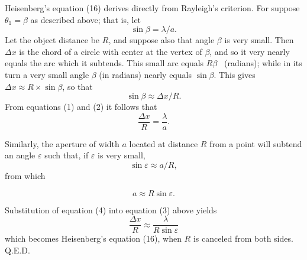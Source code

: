 \documentclass{article}
\begin{document}
Heisenberg's equation (16) derives directly from
Rayleigh's criterion. For suppose $\theta_1 = \beta$ as described
above; that is, let
%
\begin{equation}
\sin \beta = \lambda/a. %
\end{equation}
%
Let the object distance be $R$, and suppose also that angle
$\beta$ is very small. Then $\Delta x$ is the chord of a circle with
center at the vertex of $\beta$, and so it very nearly equals the arc
which it subtends. This small arc equals $R\beta$ \ (radians);
while in its turn a very small angle $\beta$ (in radians) nearly equals
$\sin \beta$. This gives $\Delta x \approx R \times \sin\beta$, so that
%
\begin{equation}
\sin \beta \approx \Delta x/R . %
\end{equation}
%
From equations (1) and (2) it follows that
%
\begin{equation}
\frac{\Delta x}{R} = \frac{\lambda}{a}. %
\end{equation}
%


Similarly, the aperture of width $a$ located at distance $R$
from a point will subtend an angle $\varepsilon$ such that, if $\varepsilon$ is
very small,
%
\begin{equation*}
\sin \varepsilon \approx a/R,
\end{equation*}
%
from which

\begin{equation}
a \approx R \sin \varepsilon. %
\end{equation}

Substitution of equation (4) into equation (3) above yields
%
\begin{equation*}
\frac{\Delta x}{R} \approx \frac{\lambda}{R \sin \varepsilon}
\end{equation*}
%
which becomes Heisenberg's equation (16), when $R$ is canceled from
both sides. Q.E.D.

\newpage

\end{document}
